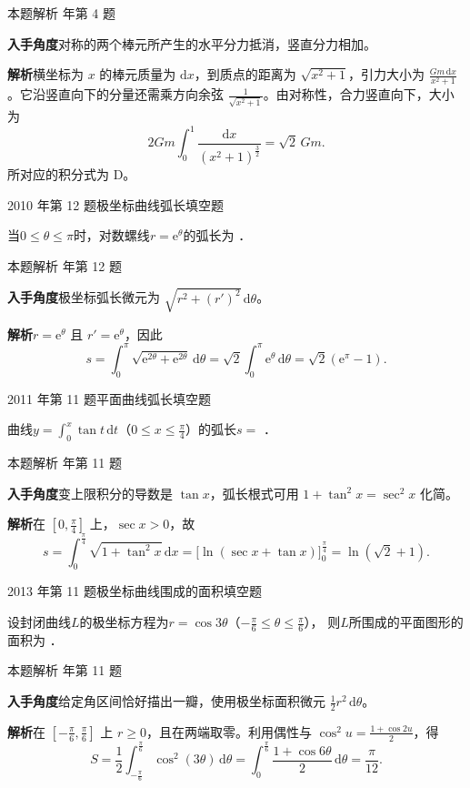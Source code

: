 \documentclass[UTF8,zihao=-4,fontset=fandol]{ctexart}
\newcommand{\blank}{\underline{\hspace{5em}}}
\newcommand{\QuestionPage}[6]{%
  \par\noindent\begin{minipage}{\linewidth}
  \raggedright
  {\small\textcolor{black!60}{#3\quad #5}\hfill\textcolor{accent}{#2}}\par\smallskip}
\newcommand{\QuestionEnd}{\end{minipage}\par\medskip}
\newcommand{\QuestionPage}[6]{%
  \clearpage
  {\small\textcolor{accent}{#1\hfill #2}}\par\medskip
  {\small\textcolor{black!60}{#3\quad #5\hfill #6}}\par\vspace{9bp}}
\newcommand{\QuestionEnd}{}
\newenvironment{QuestionSolution}[1]{%
  \clearpage
  {\small\textcolor{black!60}{本题解析\quad #1}}\par\medskip
}{\par\clearpage}
\begin{document}
\begin{QuestionSolution}{2026 年第 4 题}
\textbf{入手角度}\quad 对称的两个棒元所产生的水平分力抵消，竖直分力相加。

\textbf{解析}\quad 横坐标为 \(x\) 的棒元质量为 \(\mathrm{d}x\)，到质点的距离为 \(\sqrt{x^2+1}\)，引力大小为 \(\frac{Gm\,\mathrm{d}x}{x^2+1}\)。它沿竖直向下的分量还需乘方向余弦 \(\frac{1}{\sqrt{x^2+1}}\)。由对称性，合力竖直向下，大小为
\[
2Gm\int_0^1\frac{\mathrm{d}x}{(x^2+1)^{\frac{3}{2}}}
=\sqrt2\,Gm .
\]
所对应的积分式为 D。
\end{QuestionSolution}

\QuestionPage{3.4 定积分的应用}{填空题}{2010 年第 12 题}{2}{极坐标曲线弧长}{167 / 234}
当$0 \le \theta \le \pi$时，对数螺线$r = \mathrm{e}^{\theta}$的弧长为 \blank{}．
\QuestionEnd

\begin{QuestionSolution}{2010 年第 12 题}
\textbf{入手角度}\quad 极坐标弧长微元为 \(\sqrt{r^2+(r')^2}\,\mathrm{d}\theta\)。

\textbf{解析}\quad \(r=\mathrm{e}^\theta\) 且 \(r'=\mathrm{e}^\theta\)，因此
\[
s=\int_0^\pi\sqrt{\mathrm{e}^{2\theta}+\mathrm{e}^{2\theta}}\,\mathrm{d}\theta
=\sqrt2\int_0^\pi \mathrm{e}^\theta\,\mathrm{d}\theta
=\boxed{\sqrt2(\mathrm{e}^\pi-1)}.
\]
\end{QuestionSolution}

\QuestionPage{3.4 定积分的应用}{填空题}{2011 年第 11 题}{1}{平面曲线弧长}{168 / 234}
曲线$y = \int_0^x \tan t\,\mathrm{d} t$（$0 \le x \le \frac{\pi}{4}$）的弧长$s =$ \blank{}．
\QuestionEnd

\begin{QuestionSolution}{2011 年第 11 题}
\textbf{入手角度}\quad 变上限积分的导数是 \(\tan x\)，弧长根式可用 \(1+\tan^2x=\sec^2x\) 化简。

\textbf{解析}\quad 在 \([0,\frac{\pi}{4}]\) 上，\(\sec x>0\)，故
\[
s=\int_0^{\frac{\pi}{4}}\sqrt{1+\tan^2x}\,\mathrm{d}x
=\bigl[\ln(\sec x+\tan x)\bigr]_0^{\frac{\pi}{4}}
=\boxed{\ln(\sqrt2+1)} .
\]
\end{QuestionSolution}

\QuestionPage{3.4 定积分的应用}{填空题}{2013 年第 11 题}{2}{极坐标曲线围成的面积}{169 / 234}
设封闭曲线$L$的极坐标方程为$r = \cos 3\theta$（$- \frac{\pi}{6} \le \theta \le \frac{\pi}{6}$），
则$L$所围成的平面图形的面积为 \blank{}．
\QuestionEnd

\begin{QuestionSolution}{2013 年第 11 题}
\textbf{入手角度}\quad 给定角区间恰好描出一瓣，使用极坐标面积微元 \(\tfrac12r^2\,\mathrm{d}\theta\)。

\textbf{解析}\quad 在 \([-\frac{\pi}{6},\frac{\pi}{6}]\) 上 \(r\ge0\)，且在两端取零。利用偶性与 \(\cos^2 u=\frac{1+\cos 2u}{2}\)，得
\[
S=\frac12\int_{-\frac{\pi}{6}}^{\frac{\pi}{6}}\cos^2(3\theta)\,\mathrm{d}\theta
=\int_0^{\frac{\pi}{6}}\frac{1+\cos 6\theta}{2}\,\mathrm{d}\theta
=\boxed{\frac{\pi}{12}}.
\]
\end{QuestionSolution}
\end{document}
